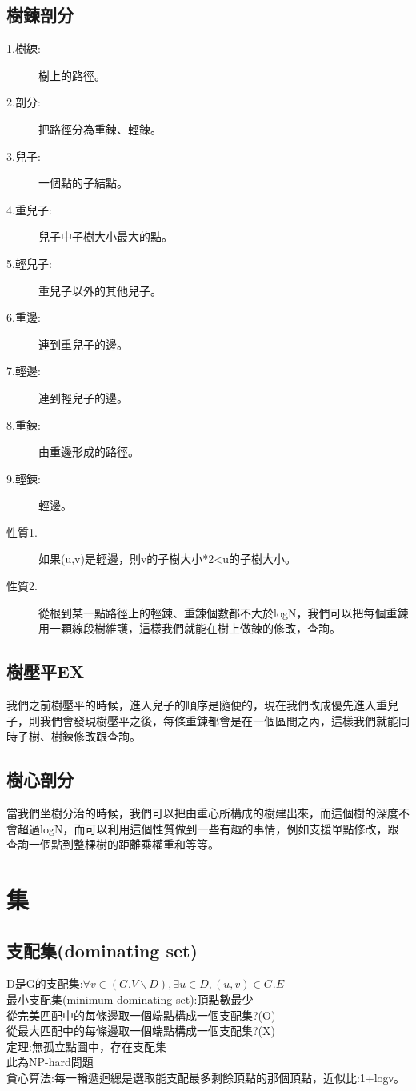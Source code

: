 \documentclass{article}
\begin{document}
\subsection{樹鍊剖分}
\begin{description}
\item[ 1.樹練:]樹上的路徑。
\item[ 2.剖分:]把路徑分為重鍊、輕鍊。
\item[ 3.兒子:]一個點的子結點。
\item[ 4.重兒子:]兒子中子樹大小最大的點。
\item[ 5.輕兒子:]重兒子以外的其他兒子。
\item[ 6.重邊:]連到重兒子的邊。
\item[ 7.輕邊:]連到輕兒子的邊。
\item[ 8.重鍊:]由重邊形成的路徑。
\item[ 9.輕鍊:]輕邊。
\end{description}
\begin{description}
\item[ 性質1.]如果(u,v)是輕邊，則v的子樹大小*2<u的子樹大小。\\
\item[ 性質2.]從根到某一點路徑上的輕鍊、重鍊個數都不大於logN，我們可以把每個重鍊用一顆線段樹維護，這樣我們就能在樹上做鍊的修改，查詢。\\
\end{description}
\subsection{樹壓平EX}
我們之前樹壓平的時候，進入兒子的順序是隨便的，現在我們改成優先進入重兒子，則我們會發現樹壓平之後，每條重鍊都會是在一個區間之內，這樣我們就能同時子樹、樹鍊修改跟查詢。
\subsection{樹心剖分}
當我們坐樹分治的時候，我們可以把由重心所構成的樹建出來，而這個樹的深度不會超過logN，而可以利用這個性質做到一些有趣的事情，例如支援單點修改，跟查詢一個點到整棵樹的距離乘權重和等等。

\section{集}
\subsection{支配集(dominating set)}
D是G的支配集:$\forall v\in(G.V\backslash D),\exists u\in D,(u,v)\in G.E$\\
最小支配集(minimum dominating set):頂點數最少\\
從完美匹配中的每條邊取一個端點構成一個支配集?(O)\\
從最大匹配中的每條邊取一個端點構成一個支配集?(X)\\
定理:無孤立點圖中，存在支配集\\
此為NP-hard問題\\
貪心算法:每一輪遞迴總是選取能支配最多剩餘頂點的那個頂點，近似比:1+logν。\\
\end{document}
